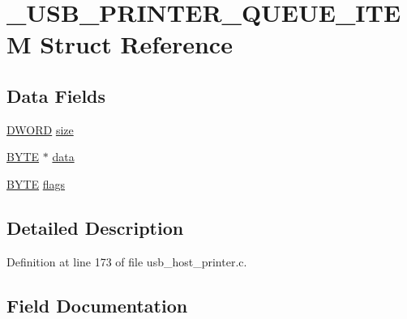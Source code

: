 \hypertarget{struct___u_s_b___p_r_i_n_t_e_r___q_u_e_u_e___i_t_e_m}{}\section{\+\_\+\+U\+S\+B\+\_\+\+P\+R\+I\+N\+T\+E\+R\+\_\+\+Q\+U\+E\+U\+E\+\_\+\+I\+T\+E\+M Struct Reference}
\label{struct___u_s_b___p_r_i_n_t_e_r___q_u_e_u_e___i_t_e_m}
\subsection*{Data Fields}
\begin{DoxyCompactItemize}
\item 
\hyperlink{_generic_type_defs_8h_ad342ac907eb044443153a22f964bf0af}{D\+W\+O\+R\+D} \hyperlink{struct___u_s_b___p_r_i_n_t_e_r___q_u_e_u_e___i_t_e_m_adfdd3a80d1d8ea7918a6d1ebee518102}{size}
\item 
\hyperlink{_generic_type_defs_8h_a4ae1dab0fb4b072a66584546209e7d58}{B\+Y\+T\+E} $\ast$ \hyperlink{struct___u_s_b___p_r_i_n_t_e_r___q_u_e_u_e___i_t_e_m_a3d1ef01c0aa6dd4984364db3f2d26fd2}{data}
\item 
\hyperlink{_generic_type_defs_8h_a4ae1dab0fb4b072a66584546209e7d58}{B\+Y\+T\+E} \hyperlink{struct___u_s_b___p_r_i_n_t_e_r___q_u_e_u_e___i_t_e_m_aa0ae44a9b44573c1d0ba505e90b6b952}{flags}
\end{DoxyCompactItemize}


\subsection{Detailed Description}


Definition at line 173 of file usb\+\_\+host\+\_\+printer.\+c.



\subsection{Field Documentation}
\hypertarget{struct___u_s_b___p_r_i_n_t_e_r___q_u_e_u_e___i_t_e_m_a3d1ef01c0aa6dd4984364db3f2d26fd2}{}
